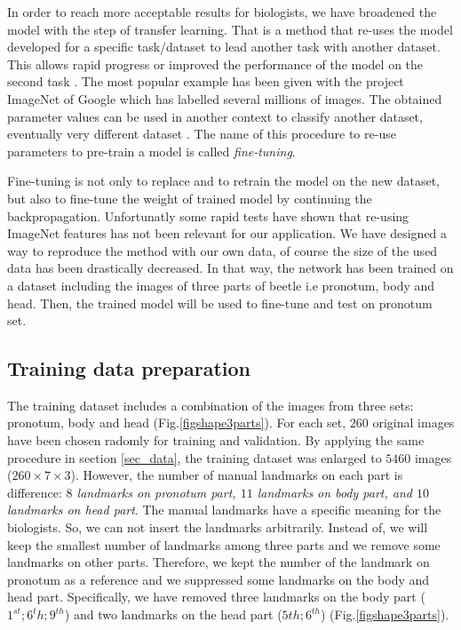 \documentclass[10pt]{article}
\begin{document}
In order to reach more acceptable results for biologists, we have
broadened the model with the step of transfer learning. That is a
method that re-uses the model developed for a specific task/dataset
to lead  another task with another dataset. This allows rapid progress or improved the performance of the
model on the second task \cite{torrey2009transfer}. The most popular
example has been given with the project ImageNet of Google \cite{imagenet_cvpr09} which has labelled several millions of images. The obtained parameter values can
be used in another context to classify another dataset, eventually
very different dataset \cite{margeta_mri}. The name of this procedure to re-use parameters
to pre-train a model is called \textit{fine-tuning}.

Fine-tuning is not only to replace and to retrain the model on the new
dataset, but also to fine-tune the weight of trained model by continuing the
backpropagation. Unfortunatly some rapid tests have shown that
re-using ImageNet features has not been relevant for our
application. We have designed a way to reproduce the method with our
own data, of course the size of the used data has been drastically decreased.
In that way, the network has been trained on a dataset including
the images of three parts of beetle i.e pronotum, body and head. Then,
the trained model will be used to fine-tune and test on pronotum set.


\subsection{Training data preparation}
The training dataset includes a combination of the images from three
sets: pronotum, body and head (Fig.\ref{figshape3parts}). For each
set, $260$ original images have been chosen radomly for training and
validation. By applying the same procedure in section \ref{sec_data},
the training dataset was enlarged to $5460$ images ($260 \times 7
\times 3$). However, the number of manual landmarks on each part is
difference: \textit{$8$ landmarks on pronotum part, $11$ landmarks on
  body part, and $10$ landmarks on head part}. The manual landmarks
have a specific meaning for the biologists. So, we can not insert the
landmarks arbitrarily. Instead of, we will keep the smallest number of
landmarks among three parts and we remove some landmarks on other
parts. Therefore, we kept the number of the landmark on pronotum as a
reference and we suppressed some landmarks on the body and head
part. Specifically, we have removed three landmarks on the body part
($1^{st}; 6^{t}h; 9^{th}$) and two landmarks on the head part ($5{th};
6^{th}$) (Fig.\ref{figshape3parts}).
\end{document}
